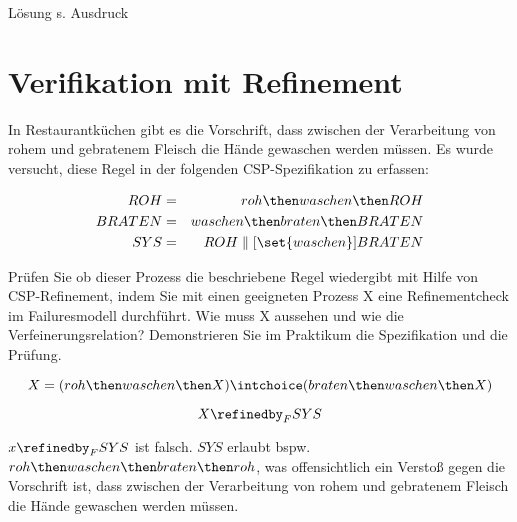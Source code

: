 \documentclass{scrreprt}
\begin{document}
Lösung s. Ausdruck

\section{Verifikation mit Refinement}

In Restaurantküchen gibt es die Vorschrift, dass zwischen der Verarbeitung von
rohem und gebratenem Fleisch die Hände gewaschen werden müssen. Es wurde
versucht, diese Regel in der folgenden CSP-Spezifikation zu erfassen:

\begin{eqnarray*}
  ROH &=& roh \then waschen \then ROH \\
  BRATEN &=& waschen \then braten \then BRATEN \\
  SYS &=& ROH \parallel[\set{waschen}] BRATEN
\end{eqnarray*}

Prüfen Sie ob dieser Prozess die beschriebene Regel wiedergibt mit Hilfe von CSP-Refinement,
indem Sie mit einen geeigneten Prozess X eine Refinementcheck im Failuresmodell durchführt.
Wie muss X aussehen und wie die Verfeinerungsrelation?
Demonstrieren Sie im Praktikum die Spezifikation und die Prüfung.

\begin{equation*}
  X = (roh \then waschen \then X) \intchoice (braten \then waschen \then X)
\end{equation*}

\begin{equation*}
  X \refinedby_F SYS
\end{equation*}

$x \refinedby_F SYS$ ist falsch. $SYS$ erlaubt bspw. $roh \then waschen \then braten \then roh$,
was offensichtlich ein Verstoß gegen die Vorschrift ist, dass zwischen der Verarbeitung von
rohem und gebratenem Fleisch die Hände gewaschen werden müssen.
\end{document}
